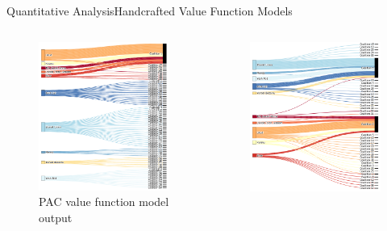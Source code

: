 \documentclass[xcolor=dvipsnames]{beamer}
\begin{document}
\begin{frame}{Quantitative Analysis}{Handcrafted Value Function Models}
  \small
  \begin{columns}
  \begin{figure}
    \includegraphics[width=\linewidth]{value_function_pac}
    \caption{PAC value function model output}
  \end{figure}
  \begin{figure}
    \includegraphics[width=\linewidth]{value_function}

\end{figure}
\end{columns}
\end{frame}
\end{document}
